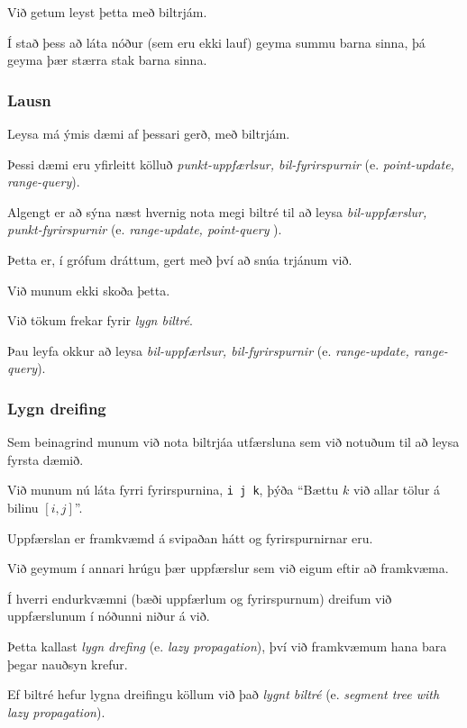 {
	{
		\item<1-> Við getum leyst þetta með biltrjám.
		\item<2-> Í stað þess að láta nóður (sem eru ekki lauf) geyma summu barna sinna, þá geyma þær stærra stak barna sinna.
	}
}

{
	\frametitle{Lausn}
}

{
	{
		\item<1-> Leysa má ýmis dæmi af þessari gerð, með biltrjám.
		\item<2-> Þessi dæmi eru yfirleitt kölluð \emph{punkt-uppfærlsur, bil-fyrirspurnir} (e. \emph{point-update, range-query}).
		\item<3-> Algengt er að sýna næst hvernig nota megi biltré til að leysa \emph{bil-uppfærslur, punkt-fyrirspurnir}
					(e. \emph{range-update, point-query }).
		\item<4-> Þetta er, í grófum dráttum, gert með því að snúa trjánum við.
		\item<5-> Við munum ekki skoða þetta.
		\item<6-> Við tökum frekar fyrir \emph{lygn biltré}.
		\item<7-> Þau leyfa okkur að leysa \emph{bil-uppfærlsur, bil-fyrirspurnir} (e. \emph{range-update, range-query}).
	}
}

{
	\frametitle{Lygn dreifing}
	{
		\item<1-> Sem beinagrind munum við nota biltrjáa utfærsluna sem við notuðum til að leysa fyrsta dæmið.
		\item<2-> Við munum nú láta fyrri fyrirspurnina, \texttt{i j k}, þýða ``Bættu $k$ við allar tölur á bilinu $[i, j]$''.
		\item<3-> Uppfærslan er framkvæmd á svipaðan hátt og fyrirspurnirnar eru.
		\item<4-> Við geymum í annari hrúgu þær uppfærslur sem við eigum eftir að framkvæma.
		\item<5-> Í hverri endurkvæmni (bæði uppfærlum og fyrirspurnum) dreifum við uppfærslunum í nóðunni niður á við.
		\item<6-> Þetta kallast \emph{lygn drefing} (e. \emph{lazy propagation}), því við framkvæmum hana bara þegar nauðsyn krefur.
		\item<7-> Ef biltré hefur lygna dreifingu köllum við það \emph{lygnt biltré} (e. \emph{segment tree with lazy propagation}).
	}
}

